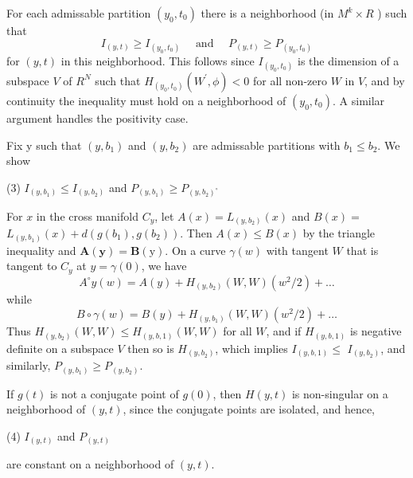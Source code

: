 \documentclass[10pt]{article}
\begin{document}
For each admissable partition $\left(y_{0}, t_{0}\right)$ there is a neighborhood (in $M^{k} \times R$ ) such that
$$
I_{(y, t)} \geq I_{\left(y_{0}, t_{0}\right)} \quad \text { and } \quad P_{(y, t)} \geq P_{\left(y_{0}, t_{0}\right)}
$$
for $(y, t)$ in this neighborhood. This follows since $I_{\left(y_{0}, t_{0}\right)}$ is the dimension of a subspace $V$ of $R^{N}$ such that $H_{\left(y_{0}, t_{0}\right)}\left(W^{\prime}, \phi\right)<0$ for all non-zero $W$ in $V$, and by continuity the inequality must hold on a neighborhood of $\left(y_{0}, t_{0}\right)$. A similar argument handles the positivity case.

Fix y such that $\left(y, b_{1}\right)$ and $\left(y, b_{2}\right)$ are admissable partitions with $b_{1} \leq b_{2} .$ We show

(3) $I_{\left(y, b_{1}\right)} \leq I_{\left(y, b_{2}\right)}$ and $P_{\left(y, b_{1}\right)} \geq P_{\left(y, b_{2}\right)^{\circ}}$

For $x$ in the cross manifold $C_{y}$, let $A(x)=L_{\left(y, b_{2}\right)}(x)$ and $B(x)=$ $L_{\left(y, b_{1}\right)}(x)+d\left(g\left(b_{1}\right), g\left(b_{2}\right)\right)$. Then $A(x) \leq B(x)$ by the triangle inequality and $\boldsymbol{A}(\boldsymbol{y})=\boldsymbol{B}(\mathrm{y})$. On a curve $\gamma(w)$ with tangent $W$ that is tangent to $C_{y}$ at $y=\gamma(0)$, we have
$$
A^{\circ} y(w)=A(y)+H_{\left(y, b_{2}\right)}(W, W)\left(w^{2} / 2\right)+\ldots
$$
while
$$
B \circ \gamma(w)=B(y)+H_{\left(y, b_{1}\right)}(W, W)\left(w^{2} / 2\right)+\ldots
$$
Thus $H_{\left(y, b_{2}\right)}(W, W) \leq H_{(y, b, 1)}(W, W)$ for all $W$, and if $H_{(y, b, 1)}$ is negative definite on a subspace $V$ then so is $H_{\left(y, b_{2}\right)}$, which implies $I_{(y, b, 1)} \leq$ $I_{\left(y, b_{2}\right)}$, and similarly, $P_{\left(y, b_{1}\right)} \geq P_{\left(y, b_{2}\right)}$.

If $g(t)$ is not a conjugate point of $g(0)$, then $H(y, t)$ is non-singular on a neighborhood of $(y, t)$, since the conjugate points are isolated, and hence,

(4) $I_{(y, t)}$ and $P_{(y, t)}$

are constant on a neighborhood of $(y, t)$.
\end{document}
